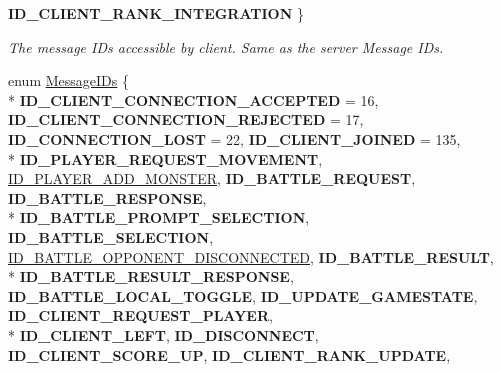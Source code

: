 \begin{DoxyCompactItemize}
{\bfseries I\-D\-\_\-\-C\-L\-I\-E\-N\-T\-\_\-\-R\-A\-N\-K\-\_\-\-I\-N\-T\-E\-G\-R\-A\-T\-I\-O\-N}
 \}
\begin{DoxyCompactList}\small\item\em The message I\-Ds accessible by client. Same as the server Message I\-Ds. \end{DoxyCompactList}\item 
enum \hyperlink{namespace_champ_net_plugin_a2ade5cfa7cf6c25ab7236c6b54a57821}{Message\-I\-Ds} \{ \\*
{\bfseries I\-D\-\_\-\-C\-L\-I\-E\-N\-T\-\_\-\-C\-O\-N\-N\-E\-C\-T\-I\-O\-N\-\_\-\-A\-C\-C\-E\-P\-T\-E\-D} = 16, 
{\bfseries I\-D\-\_\-\-C\-L\-I\-E\-N\-T\-\_\-\-C\-O\-N\-N\-E\-C\-T\-I\-O\-N\-\_\-\-R\-E\-J\-E\-C\-T\-E\-D} = 17, 
{\bfseries I\-D\-\_\-\-C\-O\-N\-N\-E\-C\-T\-I\-O\-N\-\_\-\-L\-O\-S\-T} = 22, 
{\bfseries I\-D\-\_\-\-C\-L\-I\-E\-N\-T\-\_\-\-J\-O\-I\-N\-E\-D} = 135, 
\\*
{\bfseries I\-D\-\_\-\-P\-L\-A\-Y\-E\-R\-\_\-\-R\-E\-Q\-U\-E\-S\-T\-\_\-\-M\-O\-V\-E\-M\-E\-N\-T}, 
\hyperlink{namespace_champ_net_plugin_a2ade5cfa7cf6c25ab7236c6b54a57821ad42c079bb7459dbaf419eeb2e845f3e2}{I\-D\-\_\-\-P\-L\-A\-Y\-E\-R\-\_\-\-A\-D\-D\-\_\-\-M\-O\-N\-S\-T\-E\-R}, 
{\bfseries I\-D\-\_\-\-B\-A\-T\-T\-L\-E\-\_\-\-R\-E\-Q\-U\-E\-S\-T}, 
{\bfseries I\-D\-\_\-\-B\-A\-T\-T\-L\-E\-\_\-\-R\-E\-S\-P\-O\-N\-S\-E}, 
\\*
{\bfseries I\-D\-\_\-\-B\-A\-T\-T\-L\-E\-\_\-\-P\-R\-O\-M\-P\-T\-\_\-\-S\-E\-L\-E\-C\-T\-I\-O\-N}, 
{\bfseries I\-D\-\_\-\-B\-A\-T\-T\-L\-E\-\_\-\-S\-E\-L\-E\-C\-T\-I\-O\-N}, 
\hyperlink{namespace_champ_net_plugin_a2ade5cfa7cf6c25ab7236c6b54a57821addd7d4ef5710787934d893be10785f0d}{I\-D\-\_\-\-B\-A\-T\-T\-L\-E\-\_\-\-O\-P\-P\-O\-N\-E\-N\-T\-\_\-\-D\-I\-S\-C\-O\-N\-N\-E\-C\-T\-E\-D}, 
{\bfseries I\-D\-\_\-\-B\-A\-T\-T\-L\-E\-\_\-\-R\-E\-S\-U\-L\-T}, 
\\*
{\bfseries I\-D\-\_\-\-B\-A\-T\-T\-L\-E\-\_\-\-R\-E\-S\-U\-L\-T\-\_\-\-R\-E\-S\-P\-O\-N\-S\-E}, 
{\bfseries I\-D\-\_\-\-B\-A\-T\-T\-L\-E\-\_\-\-L\-O\-C\-A\-L\-\_\-\-T\-O\-G\-G\-L\-E}, 
{\bfseries I\-D\-\_\-\-U\-P\-D\-A\-T\-E\-\_\-\-G\-A\-M\-E\-S\-T\-A\-T\-E}, 
{\bfseries I\-D\-\_\-\-C\-L\-I\-E\-N\-T\-\_\-\-R\-E\-Q\-U\-E\-S\-T\-\_\-\-P\-L\-A\-Y\-E\-R}, 
\\*
{\bfseries I\-D\-\_\-\-C\-L\-I\-E\-N\-T\-\_\-\-L\-E\-F\-T}, 
{\bfseries I\-D\-\_\-\-D\-I\-S\-C\-O\-N\-N\-E\-C\-T}, 
{\bfseries I\-D\-\_\-\-C\-L\-I\-E\-N\-T\-\_\-\-S\-C\-O\-R\-E\-\_\-\-U\-P}, 
{\bfseries I\-D\-\_\-\-C\-L\-I\-E\-N\-T\-\_\-\-R\-A\-N\-K\-\_\-\-U\-P\-D\-A\-T\-E}, 

\end{DoxyCompactItemize}
